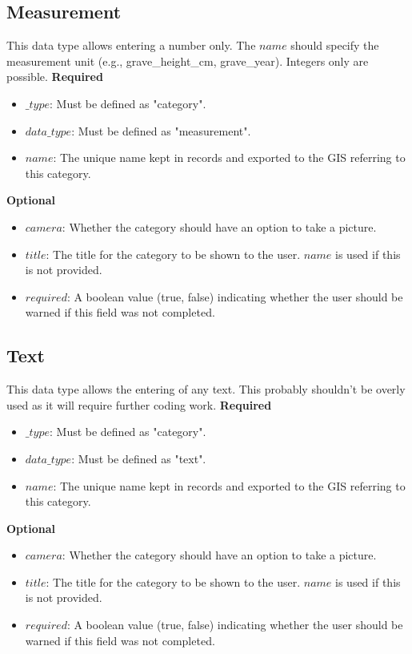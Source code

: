 \documentclass{scrreprt}
\begin{document}
\newpage
\subsection{Measurement}
This data type allows entering a number only. The $name$ should specify the measurement unit (e.g., grave_height_cm, grave_year). Integers only are possible.
\textbf{Required}
\begin{itemize}
\item $\_type$:  Must be defined as "category".
\item $data\_type$: Must be defined as "measurement".
\item $name$: The unique name kept in records and exported to the GIS referring to this category.
\end{itemize}
\textbf{Optional}
\begin{itemize}
\item $camera$: Whether the category should have an option to take a picture.
\item $title$: The title for the category to be shown to the user. $name$ is used if this is not provided.
\item $required$: A boolean value (true, false) indicating whether the user should be warned if this field was not completed.
\end{itemize}

\newpage
\subsection{Text}
This data type allows the entering of any text. This probably shouldn't be overly used as it will require further coding work.
\textbf{Required}
\begin{itemize}
\item $\_type$:  Must be defined as "category".
\item $data\_type$: Must be defined as "text".
\item $name$: The unique name kept in records and exported to the GIS referring to this category.
\end{itemize}
\textbf{Optional}
\begin{itemize}
\item $camera$: Whether the category should have an option to take a picture.
\item $title$: The title for the category to be shown to the user. $name$ is used if this is not provided.
\item $required$: A boolean value (true, false) indicating whether the user should be warned if this field was not completed.
\end{itemize}
\end{document}
